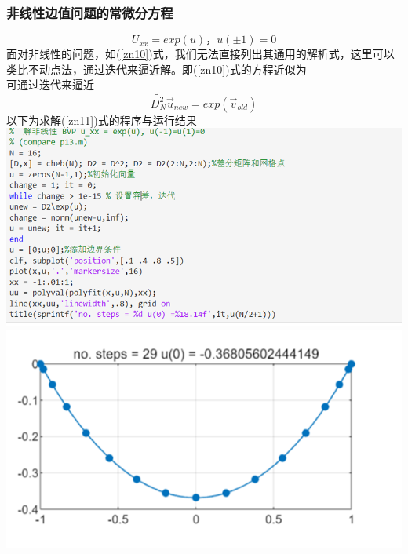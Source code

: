 \documentclass[12pt]{ctexart}
\numberwithin{equation}{section} %
\begin{document}
   \subsubsection{非线性边值问题的常微分方程}
   \begin{equation}\label{zn10}
       U_{xx}=exp(u)，u(\pm1)=0
   \end{equation}
   面对非线性的问题，如(\ref{zn10})式，我们无法直接列出其通用的解析式，这里可以类比不动点法，通过迭代来逼近解。即(\ref{zn10})式的方程近似为\\
   可通过迭代来逼近
   \begin{equation}\label{zn11}
\widetilde{D_N^2}\Vec{u}_{new}=exp(\Vec{v}_{old})
   \end{equation}
   以下为求解(\ref{zn11})式的程序与运行结果\\
   \includegraphics[width=1\textwidth]{程序图4.png}\\
   \includegraphics[width=1\textwidth]{运行结果图3.png}
\end{document}
